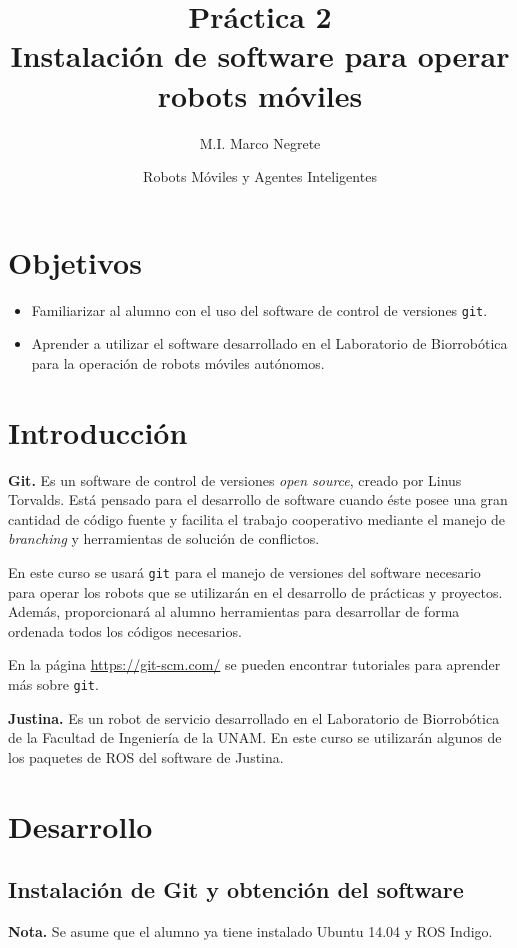 \documentclass[letterpaper,12pt]{article}
\title{Práctica 2 \\ Instalación de software para operar robots móviles}
\author{M.I. Marco Negrete}
\date{Robots Móviles y Agentes Inteligentes}
\begin{document}
\renewcommand{\tablename}{Tabla}
\maketitle
\section*{Objetivos}
\begin{itemize}
\item Familiarizar al alumno con el uso del software de control de versiones \texttt{git}.
\item Aprender a utilizar el software desarrollado en el Laboratorio de Biorrobótica para la operación de robots móviles autónomos. 
\end{itemize}

\section{Introducción}
\textbf{Git.} Es un software de control de versiones \textit{open source}, creado por Linus Torvalds. Está pensado para el desarrollo de software cuando éste posee una gran cantidad de código fuente y facilita el trabajo cooperativo mediante el manejo de \textit{branching} y herramientas de solución de conflictos. 

En este curso se usará \texttt{git} para el manejo de versiones del software necesario para operar los robots que se utilizarán en el desarrollo de prácticas y proyectos. Además, proporcionará al alumno herramientas para desarrollar de forma ordenada todos los códigos necesarios.

En la página \url{https://git-scm.com/} se pueden encontrar tutoriales para aprender más sobre \texttt{git}.

\textbf{Justina.} Es un robot de servicio desarrollado en el Laboratorio de Biorrobótica de la Facultad de Ingeniería de la UNAM. En este curso se utilizarán algunos de los paquetes de ROS del software de Justina. 

\section{Desarrollo}
\subsection{Instalación de Git y obtención del software}
\textbf{Nota.} Se asume que el alumno ya tiene instalado Ubuntu 14.04 y ROS Indigo. 
\end{document}
